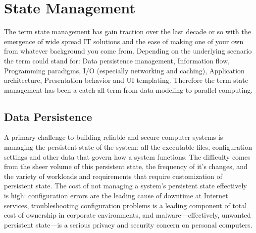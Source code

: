 \documentclass[12pt,twoside]{article}
\begin{document}
\section{State Management}
The term state management has gain traction over the last decade or so with the emergence of wide spread IT solutions and the ease of making one of your own from whatever background you come from. Depending on the underlying scenario the term could stand for:
Data persistence management,
Information flow,
Programming paradigms,
I/O (especially networking and caching), %
Application architecture,
Presentation behavior and 
UI templating. Therefore the term state management has been a catch-all term from data modeling to parallel computing. 

\subsection{Data Persistence}

A primary challenge to building reliable and secure computer systems is managing the persistent state of the system: all the executable files, configuration settings and other data that govern how a system functions. The difficulty comes from the sheer volume of this persistent state, the frequency of it's changes, and the variety of workloads and requirements that require customization of persistent state. The cost of not managing a system's persistent state effectively is high: configuration errors are the leading cause of downtime at Internet services, troubleshooting configuration problems is a leading component of total cost of ownership in corporate environments, and malware—effectively, unwanted persistent state—is a serious privacy and security concern on personal computers.
\end{document}
